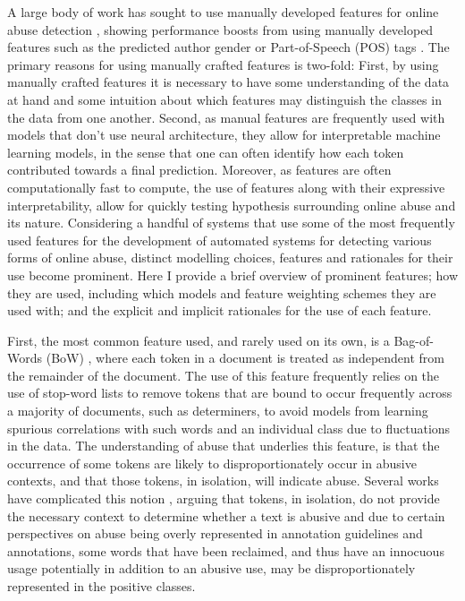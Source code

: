 A large body of work has sought to use manually developed features for online abuse detection \citep{Davidson:2017,Waseem:2017,Ibrohim:2019,Vega:2019,Wiegand:2018,Tian:2020,Kumar:2019,Fortuna:2018}, showing performance boosts from using manually developed features such as the predicted author gender \citep{Waseem-Hovy:2016} or Part-of-Speech (POS) tags \citep{Davidson:2017}. The primary reasons for using manually crafted features is two-fold: First, by using manually crafted features it is necessary to have some understanding of the data at hand and some intuition about which features may distinguish the classes in the data from one another. Second, as manual features are frequently used with models that don't use neural architecture, they allow for interpretable machine learning models, in the sense that one can often identify how each token contributed towards a final prediction. Moreover, as features are often computationally fast to compute, the use of features along with their expressive interpretability, allow for quickly testing hypothesis surrounding online abuse and its nature.
Considering a handful of systems that use some of the most frequently used features for the development of automated systems for detecting various forms of online abuse, distinct modelling choices, features and rationales for their use become prominent. Here I provide a brief overview of prominent features; how they are used, including which models and feature weighting schemes they are used with; and the explicit and implicit rationales for the use of each feature.

First, the most common feature used, and rarely used on its own, is a Bag-of-Words (BoW) \citep{Fortuna:2018,Davidson:2017}, where each token in a document is treated as independent from the remainder of the document. The use of this feature frequently relies on the use of stop-word lists to remove tokens that are bound to occur frequently across a majority of documents, such as determiners, to avoid models from learning spurious correlations with such words and an individual class due to fluctuations in the data. The understanding of abuse that underlies this feature, is that the occurrence of some tokens are likely to disproportionately occur in abusive contexts, and that those tokens, in isolation, will indicate abuse. Several works have complicated this notion \citep[e.g.]{Waseem:2018,Davidson:2019}, arguing that tokens, in isolation, do not provide the necessary context to determine whether a text is abusive and due to certain perspectives on abuse being overly represented \citep{Waseem:2016} in annotation guidelines and annotations, some words that have been reclaimed, and thus have an innocuous usage potentially in addition to an abusive use, may be disproportionately represented in the positive classes.

